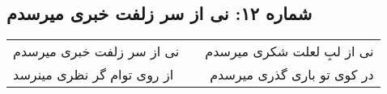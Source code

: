 \begin{center}
\section*{شماره ۱۲: نی از سر زلفت خبری میرسدم}
\label{sec:012}
\begin{longtable}{l p{0.5cm} r}
نی از سر زلفت خبری میرسدم
&&
نی از لبِ لعلت شکری میرسدم
\\
از روی توام گر نظری مینرسد
&&
در کوی تو باری گذری میرسدم
\\
\end{longtable}
\end{center}

